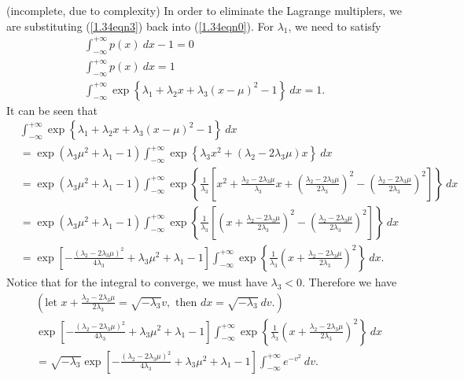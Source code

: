 \begin{answer}{(incomplete, due to complexity)}
	In order to eliminate the Lagrange multiplers, we are substituting (\ref{1.34eqn3}) back into (\ref{1.34eqn0}). For $\lambda_1$, we need to satisfy
	\begin{gather}
		\int_{-\infty}^{+\infty} p(x)\ dx - 1 = 0\\
			\int_{-\infty}^{+\infty} p(x)\ dx  = 1\\
			\int_{-\infty}^{+\infty} \exp\left\{ \lambda_1 + \lambda_2 x + \lambda_3(x-\mu)^2 - 1 \right\}\ dx = 1.
	\end{gather}
	It can be seen that
	\begin{align}
		&\int_{-\infty}^{+\infty} \exp\left\{ \lambda_1 + \lambda_2 x + \lambda_3(x-\mu)^2 - 1 \right\}\ dx\\
		&= \exp\left(\lambda_3 \mu^2 + \lambda_1 - 1\right) \int_{-\infty}^{+\infty} \exp\left\{ \lambda_3 x^2 + (\lambda_2 - 2\lambda_3\mu)x \right\}\ dx\\
		&= \exp\left(\lambda_3 \mu^2 + \lambda_1 - 1\right) \int_{-\infty}^{+\infty} \exp\left\{ \frac{1}{\lambda_3} \left[  x^2 + \frac{\lambda_2 - 2\lambda_3\mu}{\lambda_3}x  + \left(\frac{\lambda_2 - 2\lambda_3\mu}{2\lambda_3}\right)^2 - \left(\frac{\lambda_2 - 2\lambda_3\mu}{2\lambda_3}\right)^2\right] \right\}\ dx\\
		&= \exp\left(\lambda_3 \mu^2 + \lambda_1 - 1\right) \int_{-\infty}^{+\infty} \exp\left\{ \frac{1}{\lambda_3} \left[ \left( x + \frac{\lambda_2 - 2\lambda_3\mu}{2\lambda_3} \right)^2 - \left(\frac{\lambda_2 - 2\lambda_3\mu}{2\lambda_3}\right)^2 \right] \right\}\ dx\\
		&= \exp\left[ -\frac{(\lambda_2 - 2\lambda_3\mu)^2}{4\lambda_3} + \lambda_3 \mu^2 + \lambda_1 - 1 \right] \int_{-\infty}^{+\infty} \exp\left\{ \frac{1}{\lambda_3} \left( x + \frac{\lambda_2 - 2\lambda_3\mu}{2\lambda_3} \right)^2  \right\}\ dx.\label{1.34eqn4}
	\end{align}
	Notice that for the integral to converge, we must have $\lambda_3 < 0$. Therefore we have
	\begin{align}
		&\left(\mbox{let }  x + \frac{\lambda_2 - 2\lambda_3\mu}{2\lambda_3} = \sqrt{-\lambda_3}v, \mbox{ then } dx = \sqrt{-\lambda_3}\ dv. \right) \nonumber \\
		& \exp\left[ -\frac{(\lambda_2 - 2\lambda_3\mu)^2}{4\lambda_3} + \lambda_3 \mu^2 + \lambda_1 - 1 \right] \int_{-\infty}^{+\infty} \exp\left\{ \frac{1}{\lambda_3} \left( x + \frac{\lambda_2 - 2\lambda_3\mu}{2\lambda_3} \right)^2  \right\}\ dx\\
		&=  \sqrt{-\lambda_3}\exp\left[ -\frac{(\lambda_2 - 2\lambda_3\mu)^2}{4\lambda_3} + \lambda_3 \mu^2 + \lambda_1 - 1 \right] \int_{-\infty}^{+\infty} e^{-v^2}\ dv.

\end{align}
\end{answer}
